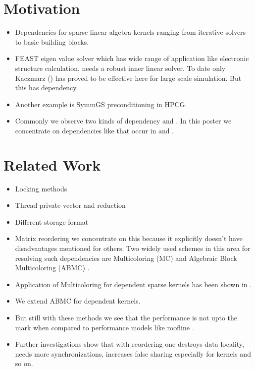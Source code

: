 \section{Motivation}
\begin{itemize}
	\item Dependencies for sparse linear algebra kernels ranging from iterative solvers to basic building blocks.
	\item FEAST eigen value solver which has wide range of application like electronic structure calculation, needs a robust inner linear solver. To date only Kaczmarz (\KACZ) has proved to be effective here for large scale simulation. But this has dependency. 
	\item Another example is SymmGS preconditioning in HPCG.
	\item Commonly we observe two kinds of dependency \DONE and \DTWO. In this poster we concentrate on \DTWO dependencies like that occur in \SymmSpmv and \KACZ.
\end{itemize}


\section{Related Work}
\begin{itemize}
	\item Locking methods
	\item Thread private vector and reduction \cite{thread_private_symm_spmv}
	\item Different storage format \cite{CSB,RSB} 
	\item Matrix reordering we concentrate on this because it explicitly doesn't have disadvantages mentioned for others. Two widely used schemes in this area for resolving such dependencies are Multicoloring (MC) \cite{MC,COLPACK} and Algebraic Block Multicoloring (ABMC) \cite{ABMC}.
	\item Application of Multicoloring for \DTWO dependent sparse kernels has been shown in \cite{feast_mc}.
	\item We extend ABMC for \DTWO dependent kernels.
	\item But still with these methods we see that the performance is not upto the mark when compared to performance models like roofline \cite{Williams_roofline}.
	\item Further investigations show that with reordering one destroys data locality, needs more synchronizations, increases false sharing especially for \DTWO kernels and so on.
\end{itemize}

